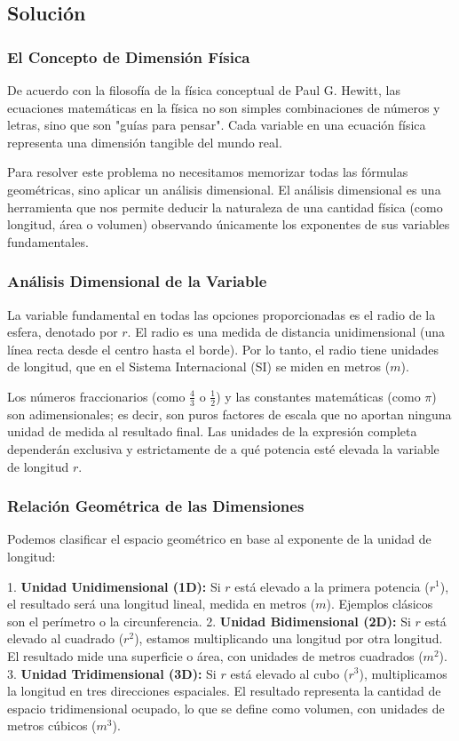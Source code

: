 \documentclass[12pt, a4paper]{article}
\begin{document}
\subsection*{Solución}

\subsubsection*{El Concepto de Dimensión Física}

De acuerdo con la filosofía de la física conceptual de Paul G. Hewitt, las ecuaciones matemáticas en la física no son simples combinaciones de números y letras, sino que son "guías para pensar". Cada variable en una ecuación física representa una dimensión tangible del mundo real. 

Para resolver este problema no necesitamos memorizar todas las fórmulas geométricas, sino aplicar un análisis dimensional. El análisis dimensional es una herramienta que nos permite deducir la naturaleza de una cantidad física (como longitud, área o volumen) observando únicamente los exponentes de sus variables fundamentales.

\subsubsection*{Análisis Dimensional de la Variable}

La variable fundamental en todas las opciones proporcionadas es el radio de la esfera, denotado por $r$. El radio es una medida de distancia unidimensional (una línea recta desde el centro hasta el borde). Por lo tanto, el radio tiene unidades de longitud, que en el Sistema Internacional (SI) se miden en metros ($m$).

Los números fraccionarios (como $\frac{4}{3}$ o $\frac{1}{2}$) y las constantes matemáticas (como $\pi$) son adimensionales; es decir, son puros factores de escala que no aportan ninguna unidad de medida al resultado final. Las unidades de la expresión completa dependerán exclusiva y estrictamente de a qué potencia esté elevada la variable de longitud $r$.

\subsubsection*{Relación Geométrica de las Dimensiones}

Podemos clasificar el espacio geométrico en base al exponente de la unidad de longitud:

1. \textbf{Unidad Unidimensional (1D):} Si $r$ está elevado a la primera potencia ($r^1$), el resultado será una longitud lineal, medida en metros ($m$). Ejemplos clásicos son el perímetro o la circunferencia.
2. \textbf{Unidad Bidimensional (2D):} Si $r$ está elevado al cuadrado ($r^2$), estamos multiplicando una longitud por otra longitud. El resultado mide una superficie o área, con unidades de metros cuadrados ($m^2$).
3. \textbf{Unidad Tridimensional (3D):} Si $r$ está elevado al cubo ($r^3$), multiplicamos la longitud en tres direcciones espaciales. El resultado representa la cantidad de espacio tridimensional ocupado, lo que se define como volumen, con unidades de metros cúbicos ($m^3$).
\end{document}
